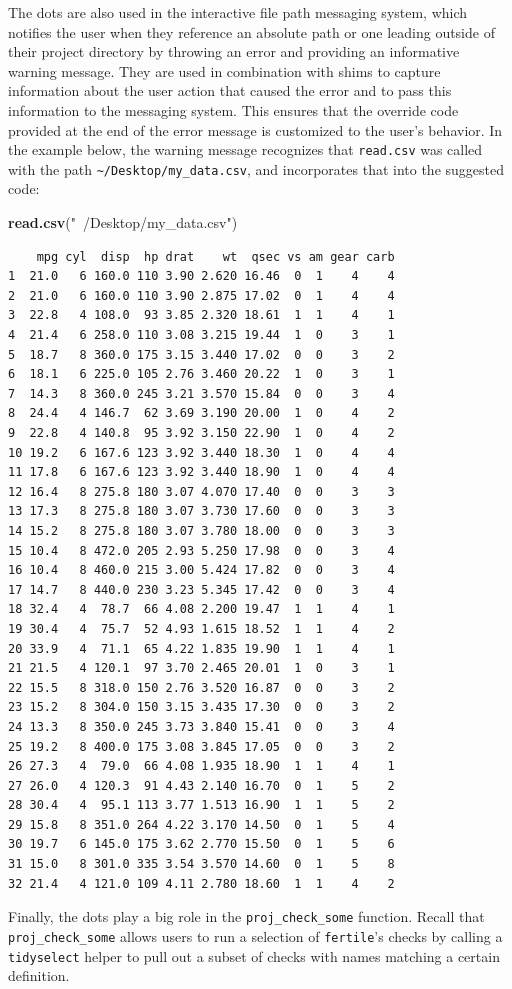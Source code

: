 \documentclass[12pt,twoside]{reedthesis}
\newenvironment{Shaded}{\begin{snugshade}}{\end{snugshade}}
\newcommand{\KeywordTok}[1]{\textcolor[rgb]{0.13,0.29,0.53}{\textbf{#1}}}
\newcommand{\StringTok}[1]{\textcolor[rgb]{0.31,0.60,0.02}{#1}}
\newcommand{\NormalTok}[1]{#1}
\begin{document}
The dots are also used in the interactive file path messaging system,
which notifies the user when they reference an absolute path or one
leading outside of their project directory by throwing an error and
providing an informative warning message. They are used in combination
with shims to capture information about the user action that caused the
error and to pass this information to the messaging system. This ensures
that the override code provided at the end of the error message is
customized to the user's behavior. In the example below, the warning
message recognizes that \texttt{read.csv} was called with the path
\texttt{\textasciitilde{}/Desktop/my\_data.csv}, and incorporates that
into the suggested code:
\begin{Shaded}
\begin{Highlighting}[]
\KeywordTok{read.csv}\NormalTok{(}\StringTok{"~/Desktop/my_data.csv"}\NormalTok{)}
\end{Highlighting}
\end{Shaded}
\begin{verbatim}
    mpg cyl  disp  hp drat    wt  qsec vs am gear carb
1  21.0   6 160.0 110 3.90 2.620 16.46  0  1    4    4
2  21.0   6 160.0 110 3.90 2.875 17.02  0  1    4    4
3  22.8   4 108.0  93 3.85 2.320 18.61  1  1    4    1
4  21.4   6 258.0 110 3.08 3.215 19.44  1  0    3    1
5  18.7   8 360.0 175 3.15 3.440 17.02  0  0    3    2
6  18.1   6 225.0 105 2.76 3.460 20.22  1  0    3    1
7  14.3   8 360.0 245 3.21 3.570 15.84  0  0    3    4
8  24.4   4 146.7  62 3.69 3.190 20.00  1  0    4    2
9  22.8   4 140.8  95 3.92 3.150 22.90  1  0    4    2
10 19.2   6 167.6 123 3.92 3.440 18.30  1  0    4    4
11 17.8   6 167.6 123 3.92 3.440 18.90  1  0    4    4
12 16.4   8 275.8 180 3.07 4.070 17.40  0  0    3    3
13 17.3   8 275.8 180 3.07 3.730 17.60  0  0    3    3
14 15.2   8 275.8 180 3.07 3.780 18.00  0  0    3    3
15 10.4   8 472.0 205 2.93 5.250 17.98  0  0    3    4
16 10.4   8 460.0 215 3.00 5.424 17.82  0  0    3    4
17 14.7   8 440.0 230 3.23 5.345 17.42  0  0    3    4
18 32.4   4  78.7  66 4.08 2.200 19.47  1  1    4    1
19 30.4   4  75.7  52 4.93 1.615 18.52  1  1    4    2
20 33.9   4  71.1  65 4.22 1.835 19.90  1  1    4    1
21 21.5   4 120.1  97 3.70 2.465 20.01  1  0    3    1
22 15.5   8 318.0 150 2.76 3.520 16.87  0  0    3    2
23 15.2   8 304.0 150 3.15 3.435 17.30  0  0    3    2
24 13.3   8 350.0 245 3.73 3.840 15.41  0  0    3    4
25 19.2   8 400.0 175 3.08 3.845 17.05  0  0    3    2
26 27.3   4  79.0  66 4.08 1.935 18.90  1  1    4    1
27 26.0   4 120.3  91 4.43 2.140 16.70  0  1    5    2
28 30.4   4  95.1 113 3.77 1.513 16.90  1  1    5    2
29 15.8   8 351.0 264 4.22 3.170 14.50  0  1    5    4
30 19.7   6 145.0 175 3.62 2.770 15.50  0  1    5    6
31 15.0   8 301.0 335 3.54 3.570 14.60  0  1    5    8
32 21.4   4 121.0 109 4.11 2.780 18.60  1  1    4    2
\end{verbatim}
Finally, the dots play a big role in the \texttt{proj\_check\_some}
function. Recall that \texttt{proj\_check\_some} allows users to run a
selection of \texttt{fertile}'s checks by calling a \texttt{tidyselect}
helper to pull out a subset of checks with names matching a certain
definition.
\end{document}
